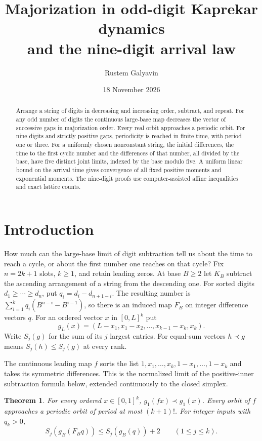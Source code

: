 \documentclass[11pt,reqno]{amsart}
\title[Majorization and nine-digit Kaprekar dynamics]{Majorization in odd-digit Kaprekar dynamics\protect\\ and the nine-digit arrival law}
\author{Rustem Galyavin}
\date{18 November 2026}
\newtheorem{theorem}{Theorem}
\begin{document}
\begin{abstract}
Arrange a string of digits in decreasing and increasing order, subtract, and repeat.
For any odd number of digits the continuous large-base map decreases the vector
of successive gaps in majorization order. Every real orbit approaches a periodic
orbit. For nine digits and strictly positive gaps, periodicity is reached in finite
time, with period one or three. For a uniformly chosen nonconstant string, the
initial differences, the time to the first cyclic number and the differences of
that number, all divided by the base, have five distinct joint limits, indexed by
the base modulo five. A uniform linear bound on the arrival time gives convergence
of all fixed positive moments and exponential moments. The nine-digit proofs use
computer-assisted affine inequalities and exact lattice counts.
\end{abstract}
\maketitle
\section{Introduction}
How much can the large-base limit of digit subtraction tell us about the time
to reach a cycle, or about the first number one reaches on that cycle?
Fix $n=2k+1$ slots, $k\ge1$, and retain leading zeros. At base $B\ge2$
let $K_B$ subtract the ascending arrangement of a string from the descending
one. For sorted digits $d_1\ge\cdots\ge d_n$, put
$q_i=d_i-d_{n+1-i}$. The resulting number is
$\sum_{i=1}^k q_i(B^{n-i}-B^{i-1})$, so there is an induced map $F_B$
on integer difference vectors $q$. For an ordered vector $x$ in $[0,L]^k$ put
\[
 g_L(x)=(L-x_1,x_1-x_2,\ldots,x_{k-1}-x_k,x_k).
\]
Write $S_j(g)$ for the sum of its $j$ largest entries. For equal-sum vectors
$h\prec g$ means $S_j(h)\le S_j(g)$ at every rank.

The continuous leading map $f$ sorts the list $1,x_1,\ldots,x_k,
1-x_1,\ldots,1-x_k$ and takes its symmetric differences. This is the
normalized limit of the positive-inner subtraction formula below, extended
continuously to the closed simplex.
\pagebreak[3]
\begin{theorem}\label{th:odd}
For every ordered $x\in[0,1]^k$, $g_1(fx)\prec g_1(x)$. Every orbit of $f$ approaches
a periodic orbit of period at most $(k+1)!$. For integer inputs with $q_k>0$,
\[
 S_j(g_B(F_Bq))\le S_j(g_B(q))+2\qquad(1\le j\le k).
\]
\end{theorem}
\end{document}
